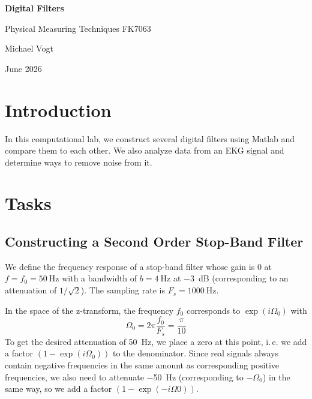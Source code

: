 \documentclass[a4paper]{scrartcl}
\begin{document}
\begin{center}
\vspace*{1cm}

\LARGE
  \textbf{Digital Filters}

\vspace{.2cm}

\normalsize
  Physical Measuring Techniques FK7063

\vspace{.5cm}
{Michael Vogt}

June 2026
\end{center}

\vspace{1cm}



\section*{Introduction}
In this computational lab, we construct several digital filters using Matlab
and compare them to each other. We also analyze data from an EKG signal
and determine ways to remove noise from it.





\section{Tasks}
\subsection{Constructing a Second Order Stop-Band Filter} \label{stop-band-manual}
We define the frequency response of a stop-band filter whose gain is $0$ at $f = f_0 = \SI{50}{\Hz}$
with a bandwidth of $b = \SI{4}{\Hz}$ at \SI{-3}{\dB} (corresponding to an attenuation of $1/\sqrt{2}$).
The sampling rate is $F_s = \SI{1000}{\Hz}$.

In the space of the z-transform, the frequency $f_0$ corresponds to $\exp(i\Omega_0)$ with
\begin{equation*}
  \Omega_0 = 2\pi \frac{f_0}{F_s} = \frac{\pi}{10}
\end{equation*}
To get the desired attenuation of \SI{50}{\Hz}, we place a zero
at this point, i.\,e. we add a factor $(1- \exp(i\Omega_0))$ to the denominator.
Since real signals always contain negative frequencies in the same amount as corresponding positive frequencies,
we also need to attenuate \SI{-50}{\Hz} (corresponding to $-\Omega_0$) in the same way,
so we add a factor $(1 - \exp(-i\Omega 0))$.
\end{document}
